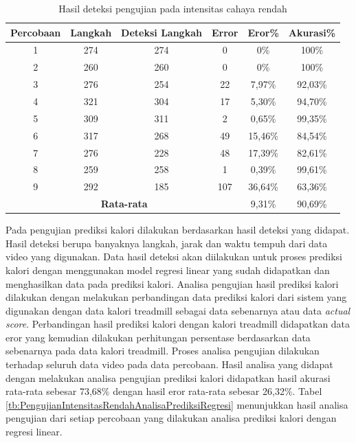 \begin{longtable}{|c|c|c|c|c|c|}
  \caption{Hasil deteksi pengujian pada intensitas cahaya rendah}
  \label{tb:PengujianIntensitasRendahAnalisaDeteksi}                                   \\
  \hline
  \rowcolor[HTML]{C0C0C0}
  \textbf{Percobaan} & \textbf{Langkah} & \textbf{Deteksi Langkah} & \textbf{Error} & \textbf{Eror\%} & \textbf{Akurasi\%} \\
  \hline
  1   & 274   & 274 & 0    & 0\%       & 100\%   \\
  \hline
  2   & 260   & 260 & 0    & 0\%       & 100\%   \\
  \hline
  3   & 276   & 254 & 22   & 7,97\%    & 92,03\%     \\
  \hline
  4   & 321   & 304 & 17   & 5,30\%    & 94,70\%   \\
  \hline
  5   & 309   & 311 & 2    & 0,65\%    & 99,35\%   \\
  \hline
  6   & 317   & 268 & 49   & 15,46\%   & 84,54\%   \\
  \hline
  7   & 276   & 228 & 48   & 17,39\%   & 82,61\%   \\
  \hline
  8   & 259   & 258 & 1    & 0,39\%    & 99,61\%   \\
  \hline
  9   & 292   & 185 & 107  & 36,64\%   & 63,36\%   \\
  \hline

  \multicolumn{4}{|c|}{\textbf{Rata-rata}} & 9,31\% & 90,69\% \\
  \hline
\end{longtable}

Pada pengujian prediksi kalori dilakukan berdasarkan hasil deteksi yang didapat. Hasil deteksi berupa banyaknya langkah, jarak dan waktu tempuh dari data video yang digunakan. Data hasil deteksi akan diilakukan untuk proses prediksi kalori dengan menggunakan model regresi linear yang sudah didapatkan dan menghasilkan data pada prediksi kalori. Analisa pengujian hasil prediksi kalori dilakukan dengan melakukan perbandingan data prediksi kalori dari sistem yang digunakan dengan data kalori treadmill sebagai data sebenarnya atau data \emph{actual score}. Perbandingan hasil prediksi kalori dengan kalori treadmill didapatkan data eror yang kemudian dilakukan perhitungan persentase berdasarkan data sebenarnya pada data kalori treadmill. Proses analisa pengujian dilakukan terhadap seluruh data video pada data percobaan. Hasil analisa yang didapat dengan melakukan analisa pengujian prediksi kalori didapatkan hasil akurasi rata-rata sebesar 73,68\% dengan hasil eror rata-rata sebesar 26,32\%. Tabel \ref{tb:PengujianIntensitasRendahAnalisaPrediksiRegresi} menunjukkan hasil analisa pengujian dari setiap percobaan yang dilakukan analisa prediksi kalori dengan regresi linear.



